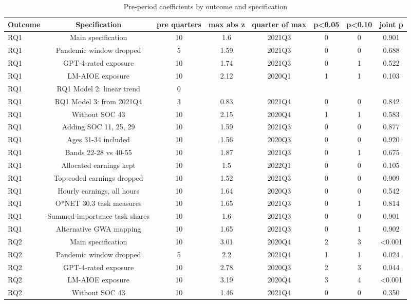 \begin{table}[htbp]\centering
\caption{Pre-period coefficients by outcome and specification}
\begin{tabular}{lccccccc}
\toprule
Outcome & Specification & pre quarters & max abs z & quarter of max & p<0.05 & p<0.10 & joint p \\
\midrule
RQ1 & Main specification & 10 & 1.6 & 2021Q3 & 0 & 0 & 0.901 \\
RQ1 & Pandemic window dropped & 5 & 1.59 & 2021Q3 & 0 & 0 & 0.688 \\
RQ1 & GPT-4-rated exposure & 10 & 1.74 & 2021Q3 & 0 & 1 & 0.522 \\
RQ1 & LM-AIOE exposure & 10 & 2.12 & 2020Q1 & 1 & 1 & 0.103 \\
RQ1 & RQ1 Model 2: linear trend & 0 &  &  &  &  &  \\
RQ1 & RQ1 Model 3: from 2021Q4 & 3 & 0.83 & 2021Q4 & 0 & 0 & 0.842 \\
RQ1 & Without SOC 43 & 10 & 2.15 & 2020Q4 & 1 & 1 & 0.583 \\
RQ1 & Adding SOC 11, 25, 29 & 10 & 1.59 & 2021Q3 & 0 & 0 & 0.877 \\
RQ1 & Ages 31-34 included & 10 & 1.56 & 2020Q3 & 0 & 0 & 0.920 \\
RQ1 & Bands 22-28 vs 40-55 & 10 & 1.87 & 2021Q3 & 0 & 1 & 0.675 \\
RQ1 & Allocated earnings kept & 10 & 1.5 & 2022Q1 & 0 & 0 & 0.105 \\
RQ1 & Top-coded earnings dropped & 10 & 1.52 & 2021Q3 & 0 & 0 & 0.909 \\
RQ1 & Hourly earnings, all hours & 10 & 1.64 & 2020Q3 & 0 & 0 & 0.542 \\
RQ1 & O*NET 30.3 task measures & 10 & 1.65 & 2021Q3 & 0 & 1 & 0.814 \\
RQ1 & Summed-importance task shares & 10 & 1.6 & 2021Q3 & 0 & 0 & 0.901 \\
RQ1 & Alternative GWA mapping & 10 & 1.65 & 2021Q3 & 0 & 1 & 0.902 \\
RQ2 & Main specification & 10 & 3.01 & 2020Q4 & 2 & 3 & <0.001 \\
RQ2 & Pandemic window dropped & 5 & 2.2 & 2021Q4 & 1 & 1 & 0.024 \\
RQ2 & GPT-4-rated exposure & 10 & 2.78 & 2020Q3 & 2 & 3 & 0.044 \\
RQ2 & LM-AIOE exposure & 10 & 3.19 & 2020Q4 & 3 & 4 & <0.001 \\
RQ2 & Without SOC 43 & 10 & 1.46 & 2021Q4 & 0 & 0 & 0.350 \\

\end{tabular}
\end{table}
